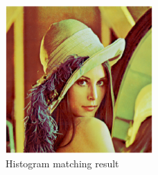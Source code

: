 \documentclass[11pt,letterpaper]{article}
\begin{document}
\begin{itemize}
	\begin{figure}
		\centering
		\includegraphics[width=0.5\textwidth]{images/p2b/hist_match.png}
		\caption{Histogram matching result}
		\label{fig:hist_match}
	\end{figure}


\end{itemize}
\end{document}
